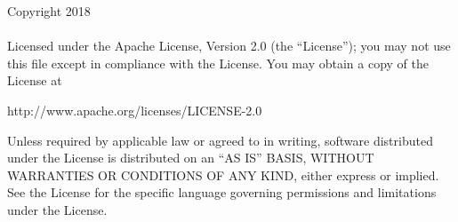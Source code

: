 
Copyright 2018 \projektname\\
\\
Licensed under the Apache License, Version 2.0 (the ``License'');
you may not use this file except in compliance with the License.
You may obtain a copy of the License at
\begin{center}
 	http://www.apache.org/licenses/LICENSE-2.0
\end{center}
Unless required by applicable law or agreed to in writing, software
distributed under the License is distributed on an ``AS IS'' BASIS,
WITHOUT WARRANTIES OR CONDITIONS OF ANY KIND, either express or implied.
See the License for the specific language governing permissions and
limitations under the License.
